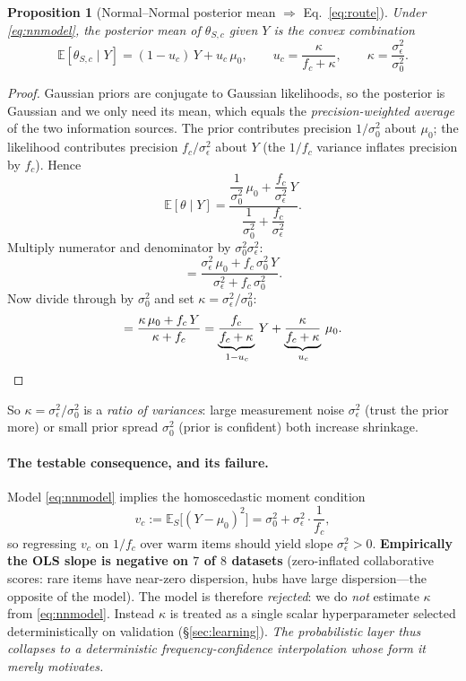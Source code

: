 \documentclass[11pt]{article}
\newtheorem{proposition}{Proposition}
\theoremstyle{remark}
\newcommand{\E}{\mathbb{E}}
\begin{document}
\begin{proposition}[Normal--Normal posterior mean $\Rightarrow$ Eq.~\eqref{eq:route}]
Under \eqref{eq:nnmodel}, the posterior mean of $\theta_{S,c}$ given $Y$ is the convex combination
\[
  \E[\theta_{S,c}\mid Y]=(1-u_c)\,Y+u_c\,\mu_0,\qquad u_c=\frac{\kappa}{f_c+\kappa},\qquad \kappa=\frac{\sigma_\epsilon^2}{\sigma_0^2}.
\]
\end{proposition}

\begin{proof}
Gaussian priors are conjugate to Gaussian likelihoods, so the posterior is Gaussian and we only need its mean,
which equals the \emph{precision-weighted average} of the two information sources. The prior contributes precision
$1/\sigma_0^2$ about $\mu_0$; the likelihood contributes precision $f_c/\sigma_\epsilon^2$ about $Y$ (the
$1/f_c$ variance inflates precision by $f_c$). Hence
\[
  \E[\theta\mid Y]
  =\frac{\dfrac{1}{\sigma_0^2}\,\mu_0+\dfrac{f_c}{\sigma_\epsilon^2}\,Y}
        {\dfrac{1}{\sigma_0^2}+\dfrac{f_c}{\sigma_\epsilon^2}} .
\]
Multiply numerator and denominator by $\sigma_0^2\sigma_\epsilon^2$:
\[
  =\frac{\sigma_\epsilon^2\,\mu_0+f_c\,\sigma_0^2\,Y}{\sigma_\epsilon^2+f_c\,\sigma_0^2}.
\]
Now divide through by $\sigma_0^2$ and set $\kappa=\sigma_\epsilon^2/\sigma_0^2$:
\[
  =\frac{\kappa\,\mu_0+f_c\,Y}{\kappa+f_c}
  =\underbrace{\frac{f_c}{f_c+\kappa}}_{\,1-u_c}\,Y+\underbrace{\frac{\kappa}{f_c+\kappa}}_{\,u_c}\,\mu_0 .
  \qedhere
\]
\end{proof}

So $\kappa=\sigma_\epsilon^2/\sigma_0^2$ is a \emph{ratio of variances}: large measurement noise $\sigma_\epsilon^2$
(trust the prior more) or small prior spread $\sigma_0^2$ (prior is confident) both increase shrinkage.

\paragraph{The testable consequence, and its failure.} Model \eqref{eq:nnmodel} implies the homoscedastic moment
condition
\[
  v_c:=\E_S\big[(Y-\mu_0)^2\big]=\sigma_0^2+\sigma_\epsilon^2\cdot\frac{1}{f_c},
\]
so regressing $v_c$ on $1/f_c$ over warm items should yield slope $\sigma_\epsilon^2>0$. \textbf{Empirically the OLS
slope is negative on $7$ of $8$ datasets} (zero-inflated collaborative scores: rare items have near-zero dispersion,
hubs have large dispersion---the opposite of the model). The model is therefore \emph{rejected}: we do \emph{not}
estimate $\kappa$ from \eqref{eq:nnmodel}. Instead $\kappa$ is treated as a single scalar hyperparameter selected
deterministically on validation (\S\ref{sec:learning}). \emph{The probabilistic layer thus collapses to a
deterministic frequency-confidence interpolation whose form it merely motivates.}
\end{document}

